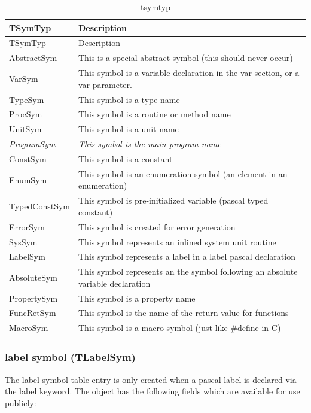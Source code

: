 \documentclass [a4paper,12pt]{article}
\begin{document}
\begin{longtable}{|l|p{10cm}|}
\caption{tsymtyp}\label{tsymtyp}\\
\hline
TSymTyp & Description \\
\hline
\endfirsthead
\hline
TSymTyp & Description \\
\hline
\endhead
\hline
\endfoot
\textsf{AbstractSym}&
    This is a special abstract symbol (this should never occur) \\
\textsf{VarSym}&
    This symbol is a variable declaration in the \textsf{var} section, or a \textsf{var} parameter. \\
\textsf{TypeSym}&
    This symbol is a type name \\
\textsf{ProcSym}&
    This symbol is a routine or method name \\
\textsf{UnitSym}&
    This symbol is a unit name \\
\textsf{\textit{ProgramSym}}&
    \textit{This symbol is the main program name} \\
\textsf{ConstSym}&
    This symbol is a constant \\
\textsf{EnumSym}&
    This symbol is an enumeration symbol (an element in an enumeration) \\
\textsf{TypedConstSym}&
    This symbol is pre-initialized variable (pascal typed constant) \\
\textsf{ErrorSym}&
    This symbol is created for error generation \\
\textsf{SysSym}&
    This symbol represents an inlined system unit routine \\
\textsf{LabelSym}&
    This symbol represents a label in a \textsf{label} pascal declaration \\
\textsf{AbsoluteSym}&
    This symbol represents an the symbol following an \textsf{absolute} variable declaration \\
\textsf{PropertySym}&
    This symbol is a property name \\
\textsf{FuncRetSym}&
    This symbol is the name of the return value for functions \\
\textsf{MacroSym}&
    This symbol is a macro symbol (just like {\#}define in C)
\end{longtable}

\subsubsection{label symbol (TLabelSym)}
\label{subsubsec:label}

The label symbol table entry is only created when a pascal label is declared
via the label keyword. The object has the following fields which are
available for use publicly:
\end{document}

